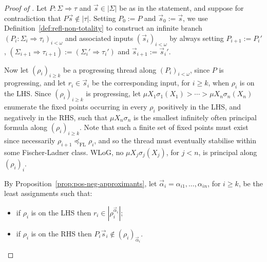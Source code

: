\documentclass[10pt,a4paper]{amsart}
\theoremstyle{plain}
\theoremstyle{definition}
\newcommand{\dfn}{:=}
\theoremstyle{plain}
\theoremstyle{definition} %
\newcommand{\FL}{\mathrm{FL}}
\newcommand{\flleq}{\preceq_\FL}
\newcommand{\seqar}{\Rightarrow}
\newcommand{\der}{P}
\newcommand{\hr}[1]{|#1|}
\begin{document}
\begin{proof}
[Proof of ]
    Let $\der : \Sigma\seqar \tau$ and $\vec s \in \hr\Sigma$ be as in the statement, and suppose for contradiction that $\der\vec s \notin \hr{ \tau}.$
Setting $\der_0 \dfn \der$ and $\vec s_0 \dfn \vec s$, we use Definition~\ref{def:refl-non-totality} to construct an infinite branch $(\der_i : \Sigma_i \seqar \tau_i)_{i < \omega}$ and associated inputs $(\vec s_i)_{i < \omega}$ by always setting $\der_{i+1} \dfn \der_i'$, $(\Sigma_{i+1}\seqar \tau_{i+1}) \dfn (\Sigma_i'\seqar \tau_i')$ and $\vec s_{i+1}\dfn \vec s_i'$.

Now let $(\rho_i)_{i\geq k}$ be a progressing thread along $(\der_i)_{i <\omega}$, since $\der$ is progressing, and let $r_i \in \vec s_i$ be the corresponding input, for $i\geq k$, when $\rho_i$ is on the LHS.
% 
% 
Since $(\rho_i)_{i\geq k}$ is progressing, let $\mu X_1\sigma_1(X_1) > \cdots > \mu X_n \sigma_n (X_n)$ enumerate the fixed points occurring in every $\rho_i$ positively in the LHS, and negatively in the RHS, such that $\mu X_n\sigma_n$ is the smallest infinitely often principal formula along $(\rho_i)_{i\geq k}$. 
Note that such a finite set of fixed points must exist since 
necessarily $\rho_{i+1}\flleq \rho_{i}$, and so the thread must eventually stabilise within some Fischer-Ladner class. 
WLoG, no $\mu X_j \sigma_j (X_j)$, for $j<n$, is principal along $(\rho_i)_i$.

By Proposition~\ref{prop:pos-neg-approximants}, let $\vec \alpha_i = \alpha_{i1}, \dots, \alpha_{in}$, for $i \geq k$, be the least assignments such that:
\begin{itemize}
    \item if $\rho_i$ is on the LHS then $r_i \in \hr{\rho_i^{\vec \alpha_i}}$; 
    \item if $\rho_i$ is on the RHS then $\der_i\vec s_i \notin (\rho_i)_{\vec \alpha_i}$. 
\end{itemize}


\end{proof}
\end{document}
